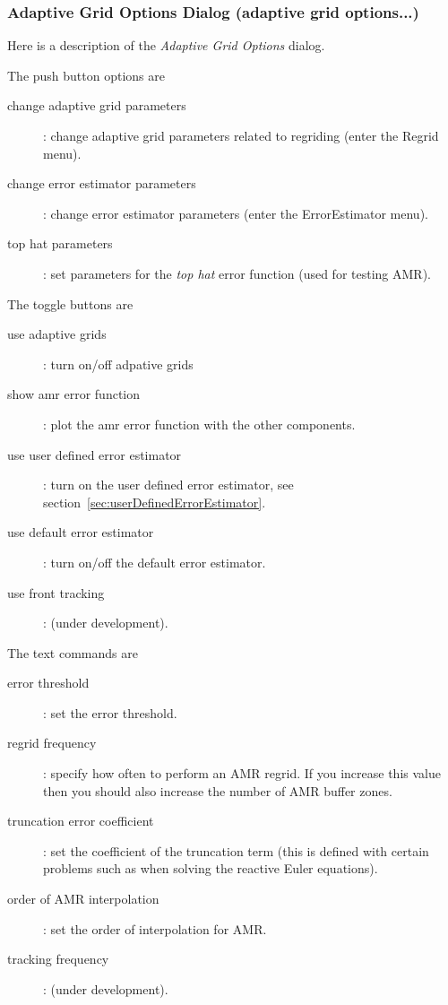 \subsubsection{Adaptive Grid Options Dialog (adaptive grid options...)}\label{sec:adaptiveGridOptions}

Here is a description of the {\em Adaptive Grid Options} dialog.

\noindent The push button options are
\begin{description}
  \item[\qquad change adaptive grid parameters] : change adaptive grid parameters related to 
                         regriding (enter the Regrid menu).
  \item[\qquad change error estimator parameters] : change error estimator parameters (enter the ErrorEstimator menu).
  \item[\qquad top hat parameters] : set parameters for the {\em top hat} error function (used for testing AMR). 
\end{description}

\noindent The toggle buttons are
\begin{description}
  \item[\qquad use adaptive grids] : turn on/off adpative grids
  \item[\qquad show amr error function] : plot the amr error function with the other components.
  \item[\qquad use user defined error estimator] : turn on the user defined error estimator, see section~\ref{sec:userDefinedErrorEstimator}.
  \item[\qquad use default error estimator] : turn on/off the default error estimator.
  \item[\qquad use front tracking] : (under development).
\end{description}

\noindent The text commands are
\begin{description}
  \item[\qquad error threshold] : set the error threshold. 
  \item[\qquad regrid frequency] : specify how often to perform an AMR regrid. If you increase this value then
             you should also increase the number of AMR buffer zones. 
  \item[\qquad truncation error coefficient] : set the coefficient of the truncation term (this is defined with
               certain problems such as when solving the reactive Euler equations).
  \item[\qquad order of AMR interpolation] : set the order of interpolation for AMR.
  \item[\qquad tracking frequency] : (under development).
\end{description}
